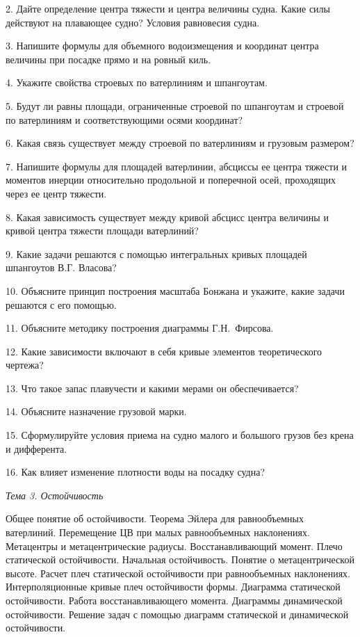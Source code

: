 2.	Дайте определение центра тяжести и центра величины судна. Какие силы действуют на плавающее судно? 
Условия равновесия судна.

3.	Напишите формулы для объемного водоизмещения и координат центра величины при посадке прямо и на ровный киль.

4.	Укажите свойства строевых по ватерлиниям и шпангоутам.

5.	Будут ли равны площади, ограниченные строевой по шпангоутам и строевой по ватерлиниям и соответствующими осями координат?

6.	Какая связь существует между строевой по ватерлиниям и грузовым размером?

7.	Напишите формулы для площадей ватерлинии, абсциссы ее центра тяжести и моментов инерции относительно продольной и поперечной осей, проходящих через ее центр тяжести.

8.	Какая зависимость существует между кривой абсцисс центра величины и кривой центра тяжести площади ватерлиний?

9.	Какие задачи решаются с помощью интегральных кривых площадей шпангоутов В.Г. Власова?

10.	Объясните принцип построения масштаба Бонжана и укажите, какие задачи решаются с его помощью.

11.	Объясните методику построения диаграммы Г.Н.~Фирсова.

12.	Какие зависимости включают в себя кривые элементов теоретического чертежа?

13.	Что такое запас плавучести и какими мерами он обеспечивается?

14.	Объясните назначение грузовой марки.

15.	Сформулируйте условия приема на судно малого и большого грузов без крена и дифферента.

16.	Как влияет изменение плотности воды на посадку судна?

\vspace{0.5cm}

\textit{Тема 3. Остойчивость}

Общее понятие об остойчивости.
Теорема Эйлера для равнообъемных ватерлиний.
Перемещение ЦВ при малых равнообъемных наклонениях.
Метацентры и метацентрические радиусы.
Восстанавливающий момент.
Плечо статической остойчивости.
Начальная остойчивость.
Понятие о метацентрической высоте.
Расчет плеч статической остойчивости при равнообъемных наклонениях.
Интерполяционные кривые плеч остойчивости формы.
Диаграмма статической остойчивости.
Работа восстанавливающего момента.
Диаграммы динамической остойчивости.
Решение задач с помощью диаграмм статической и динамической остойчивости.

